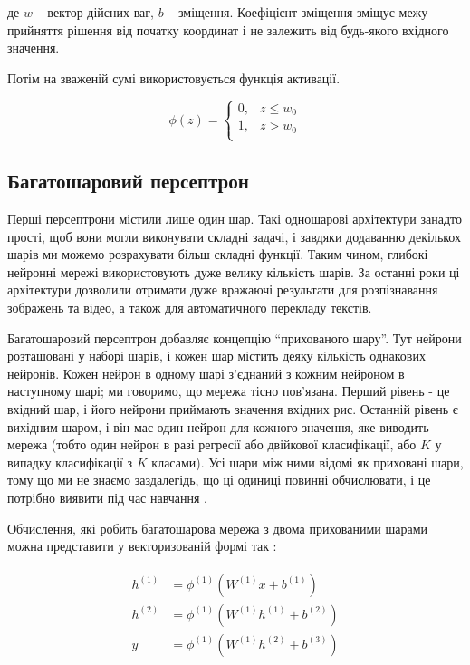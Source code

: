 де $w$ -- вектор дійсних ваг, $b$ -- зміщення.
Коефіцієнт зміщення зміщує межу прийняття рішення
від початку координат і не залежить від будь-якого
вхідного значення.

Потім на зваженій сумі використовується функція активації.

\begin{equation}
    \phi(z) = \begin{cases}
        0 ,& z \le w_0 \\
        1 ,& z > w_0 \\
    \end{cases}
    \label{eq:perceptron2}
\end{equation}

\subsection{Багатошаровий персептрон}
Перші персептрони містили лише один шар. Такі одношарові
архітектури занадто прості, щоб вони могли виконувати складні задачі,
і завдяки додаванню декількох шарів ми можемо розрахувати більш складні
функції. Таким чином, глибокі нейронні мережі використовують дуже
велику кількість шарів. За останні роки ці архітектури дозволили
отримати дуже вражаючі результати для розпізнавання зображень та
відео, а також для автоматичного перекладу текстів.

Багатошаровий персептрон добавляє концепцію
``прихованого шару''. Тут нейрони розташовані у наборі шарів,
і кожен шар містить деяку кількість однакових нейронів.
Кожен нейрон в одному шарі з'єднаний з кожним нейроном в наступному шарі;
ми говоримо, що мережа тісно пов’язана. Перший рівень - це вхідний шар,
і його нейрони приймають значення вхідних рис. 
Останній рівень є вихідним шаром, і він має один нейрон для
кожного значення, яке виводить мережа (тобто один нейрон
в разі регресії або двійкової
класифікації, або $K$  у випадку класифікації з $K$ класами).
Усі шари між ними відомі як приховані шари, тому що ми не знаємо
заздалегідь, що ці одиниці повинні обчислювати, і це потрібно
виявити під час навчання \cite{nn:multilayer-perceptrons}.

Обчислення, які робить багатошарова мережа з двома
прихованими шарами можна
представити у векторизованій формі так \cite{nn:multilayer-perceptrons}:

\vspace{0.5em}
\begin{gather}
\begin{aligned}
    h^{(1)} &= \phi^{(1)}(W^{(1)}x + b^{(1)}) \\
    h^{(2)} &= \phi^{(1)}(W^{(1)}h^{(1)} + b^{(2)}) \\
    y &= \phi^{(1)}(W^{(1)}h^{(2)} + b^{(3)}) 
\end{aligned}
\end{gather}
\vspace{\baselineskip}

